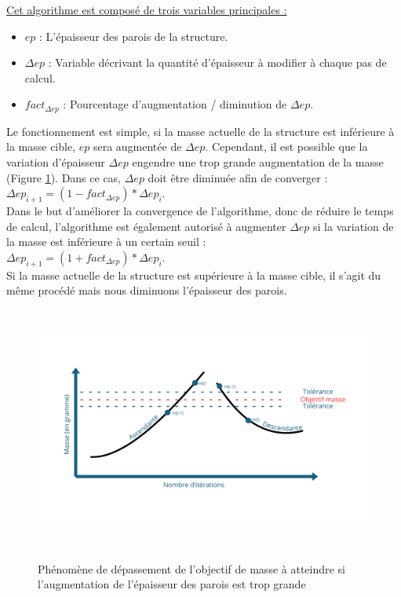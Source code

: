 \documentclass[a4paper]{article}
\begin{document}
	\underline{Cet algorithme est composé de trois variables principales :}
	
	\begin{itemize}
		\item $ep$ : L’épaisseur des parois de la structure.
		\item $\Delta ep$ : Variable décrivant la quantité d’épaisseur à modifier à chaque pas de calcul.
		\item $fact_{\Delta ep}$ : Pourcentage d’augmentation / diminution de $\Delta ep$.
	\end{itemize}

	Le fonctionnement est simple, si la masse actuelle de la structure est inférieure à la masse cible, $ep$ sera augmentée de $\Delta ep$. Cependant, il est possible que la variation d’épaisseur $\Delta ep$ engendre une trop grande augmentation de la masse (Figure \ref{trop_grande_aug_ep}). Dans ce cas, $\Delta ep$ doit être diminuée afin de converger : $\Delta ep_{i+1} = (1 - fact_{\Delta ep}) * \Delta ep_{i}$.\\
	
	Dans le but d’améliorer la convergence de l’algorithme, donc de réduire le temps de calcul, l’algorithme est également autorisé à augmenter $\Delta ep$ si la variation de la masse est inférieure à un certain seuil :\\
	$\Delta ep_{i+1} = (1 + fact_{\Delta ep}) * \Delta ep_{i}$.\\
	
	Si la masse actuelle de la structure est supérieure à la masse cible, il s'agit du même procédé mais nous diminuons l'épaisseur des parois.
	
	\begin{figure}[H]
		\centering
		\includegraphics[height=8cm]{Images/4/tolerance.pdf}\\
		\caption{Phénomène de dépassement de l'objectif de masse à atteindre si l'augmentation de l'épaisseur des parois est trop grande}
		\label{trop_grande_aug_ep}
	\end{figure}
	\newpage
			
\end{document}
